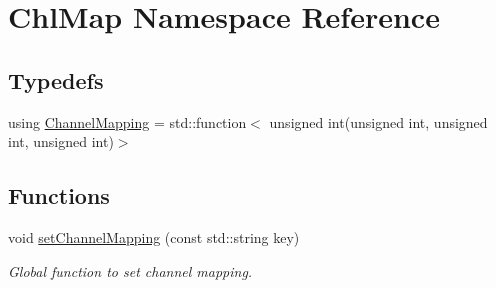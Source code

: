\hypertarget{namespace_chl_map}{}\section{Chl\+Map Namespace Reference}
\label{namespace_chl_map}
\subsection*{Typedefs}
\begin{DoxyCompactItemize}
\item 
using \hyperlink{namespace_chl_map_a02f93d10e11f82c0ea2330212cf70545}{Channel\+Mapping} = std\+::function$<$ unsigned int(unsigned int, unsigned int, unsigned int)$>$
\end{DoxyCompactItemize}
\subsection*{Functions}
\begin{DoxyCompactItemize}
\item 
void \hyperlink{namespace_chl_map_a478e1376df593ae2963ad83ee2710ff1}{set\+Channel\+Mapping} (const std\+::string key)
\begin{DoxyCompactList}\small\item\em Global function to set channel mapping. \end{DoxyCompactList}\end{DoxyCompactItemize}
